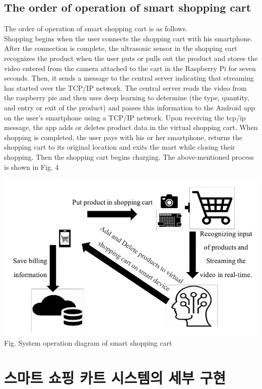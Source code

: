 \documentclass[smallextended]{svjour3}       %
\begin{document}
\hypertarget{the-order-of-operation-of-smart-shopping-cart}{%
\subsection{The order of operation of smart shopping
cart}\label{the-order-of-operation-of-smart-shopping-cart}}

The order of operation of smart shopping cart is as follows.\\
Shopping begins when the user connects the shopping cart with his
smartphone. After the connection is complete, the ultrasonic sensor in
the shopping cart recognizes the product when the user puts or pulls out
the product and stores the video entered from the camera attached to the
cart in the Raspberry Pi for seven seconds. Then, it sends a message to
the central server indicating that streaming has started over the TCP/IP
network. The central server reads the video from the raspberry pie and
then uses deep learning to determine (the type, quantity, and entry or
exit of the product) and passes this information to the Android app on
the user's smartphone using a TCP/IP network. Upon receiving the tcp/ip
message, the app adds or deletes product data in the virtual shopping
cart. When shopping is completed, the user pays with his or her
smartphone, returns the shopping cart to its original location and exits
the mart while closing their shopping. Then the shopping cart begins
charging. The above-mentioned process is shown in Fig. 4

\includegraphics{../fig/fig4.png} Fig. System operation diagram of smart
shopping cart

\hypertarget{uxc2a4uxb9c8uxd2b8-uxc1fcuxd551-uxce74uxd2b8-uxc2dcuxc2a4uxd15cuxc758-uxc138uxbd80-uxad6cuxd604}{%
\section{스마트 쇼핑 카트 시스템의 세부
구현}\label{uxc2a4uxb9c8uxd2b8-uxc1fcuxd551-uxce74uxd2b8-uxc2dcuxc2a4uxd15cuxc758-uxc138uxbd80-uxad6cuxd604}}
\end{document}

